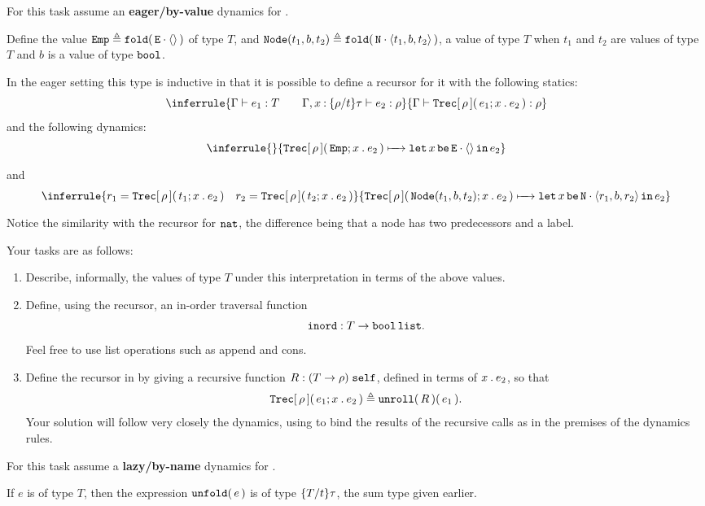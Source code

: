 \documentclass[11pt]{article}
\begin{document}

For this task assume an \textbf{eager/by-value} dynamics for \LangFPC{}.

Define the value $\EmpVal\isdef\foldexcst{t}{\dots}{\fld{\Elbl}{\unitexcst}}$ of type $T$, and
$\NodeVal{t_1}{b}{t_2}\isdef\foldexcst{t}{\dots}{\fld{\Nlbl}{\tripexcst{t_1}{b}{t_2}}}$, a value of type $T$ when $t_1$ and $t_2$ are values of type $T$ and $b$ is a value of type $\booltycst$.

In the eager setting this type is inductive in that it is possible to define a recursor for it with the following statics:
\[
  \inferrule
    {\Gamma\vdash\IsOf{e_1}{T} \qquad \Gamma,\IsOfVar{x}{\Subst{\rho}{t}{\tau}}\vdash\IsOf{e_2}{\rho}}
    {\Gamma\vdash\IsOf{\Trecabt{\rho}{e_1}{x}{e_2}}{\rho}}
\]
and the following dynamics:
\[
  \inferrule
    {\strut}
    {\Trecabt{\rho}{\EmpVal}{x}{e_2}\StepsTo \letbecst{\fld{\Elbl}{\unitexcst}}{x}{e_2}}
\]
and
\[
  \inferrule
    {r_1=\Trecabt{\rho}{t_1}{x}{e_2} \quad r_2=\Trecabt{\rho}{t_2}{x}{e_2}}
    {\Trecabt{\rho}{\NodeVal{t_1}{b}{t_2}}{x}{e_2}\StepsTo \letbecst{\fld{\Nlbl}{\tripexcst{r_1}{b}{r_2}}}{x}{e_2}}
\]
Notice the similarity with the recursor for $\nattycst$, the difference being that a node has two predecessors and a label.

Your tasks are as follows:
\begin{enumerate}
  \item Describe, informally, the values of type $T$ under this interpretation in terms of the above values.
  \item Define, using the recursor, an in-order traversal function
   \[
    \kw{inord}:T \to \listtycst{\booltycst}.
   \]
  Feel free to use list operations such as append and cons.

  \item Define the recursor in \LangFPC{} by giving a recursive function $R:\selftycst{(T\to\rho)}$, defined  in terms of $\AbsABT{x}{e_2}$, so that
  \[
    \Trecabt{\rho}{e_1}{x}{e_2} \isdef \appcst{\unselfexcst{R}}{e_1}.
  \]
  Your solution will follow very closely the dynamics, using  to bind the results of the recursive calls as in the premises of the dynamics rules.
\end{enumerate}


\bigskip

For this task assume a \textbf{lazy/by-name} dynamics for \LangFPC.

If $e$ is of type $T$, then the expression $\unfoldexcst{e}$ is of type $\Subst{T}{t}{\tau}$, the sum type given earlier.
\end{document}
